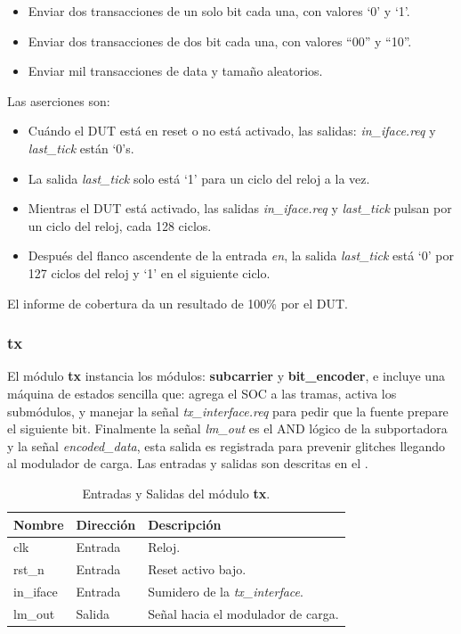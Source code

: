 \documentclass[a4paper, twoside, 11pt]{report}
\begin{document}
\begin{itemize}
  \item Enviar dos transacciones de un solo bit cada una, con valores ‘0’ y ‘1’.
  \item Enviar dos transacciones de dos bit cada una, con valores “00” y “10”.
  \item Enviar mil transacciones de data y tamaño aleatorios.
\end{itemize}

Las aserciones son:

\begin{itemize}
  \item Cuándo el DUT está en reset o no está activado, las salidas: \textit{in\_iface.req} y \textit{last\_tick} están ‘0’s.
  \item La salida \textit{last\_tick} solo está ‘1’ para un ciclo del reloj a la vez.
  \item Mientras el DUT está activado, las salidas \textit{in\_iface.req} y \textit{last\_tick} pulsan por un ciclo del reloj, cada 128 ciclos.
  \item Después del flanco ascendente de la entrada \textit{en}, la salida \textit{last\_tick} está ‘0’ por 127 ciclos del reloj y ‘1’ en el siguiente ciclo.
\end{itemize}

El informe de cobertura da un resultado de 100\% por el DUT.

\FloatBarrier
\subsubsection{tx}

El módulo \textbf{tx} instancia los módulos: \textbf{subcarrier} y \textbf{bit\_encoder}, e incluye una máquina de estados sencilla que: agrega el SOC a las tramas, activa los submódulos, y manejar la señal \textit{tx\_interface.req} para pedir que la fuente prepare el siguiente bit. Finalmente la señal \textit{lm\_out} es el AND lógico de la subportadora y la señal \textit{encoded\_data}, esta salida es registrada para prevenir glitches llegando al modulador de carga. Las entradas y salidas son descritas en el .

\begin{table}[htb]
  \centering
  \tablezebra
  \begin{tabulary}{\linewidth}{l|l|L}
    \textbf{Nombre}&\textbf{Dirección}&\textbf{Descripción} \\
    \hline
    clk&Entrada&Reloj. \\
    rst\_n&Entrada&Reset activo bajo. \\
    in\_iface&Entrada&Sumidero de la \textit{tx\_interface}. \\
    lm\_out&Salida&Señal hacia el modulador de carga. \\
  \end{tabulary}
  \caption{Entradas y Salidas del módulo \textbf{tx}.}
  \label{tab:ports_tx}
\end{table}
\end{document}

